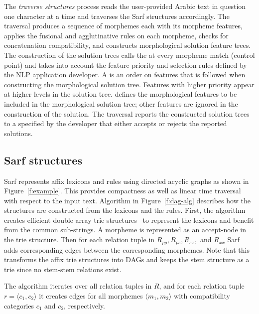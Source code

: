 The {\em traverse structures} process
reads the user-provided Arabic text in question one character at a time and traverses 
the Sarf structures accordingly. 
The traversal produces a sequence of morphemes each with its morpheme features,
applies the fusional and agglutinative rules on each morpheme, 
checks for concatenation compatibility,
and constructs morphological solution feature trees. 
The construction of the solution trees calls the  
at every morpheme match (control point) and takes into account 
the feature priority and selection rules 
defined by the NLP application developer. 
A  is an order on features that is 
followed when constructing the morphological solution tree. 
Features with higher priority appear at higher levels in the solution tree. 
 defines the morphological features to be included
in the morphological solution tree; other features are ignored in the 
construction of the solution. 
The traversal reports the constructed solution trees to a  specified by 
the developer that either accepts or rejects the reported solutions. 

\subsection{Sarf structures}


Sarf represents affix lexicons and rules using directed acyclic graphs as shown in Figure~\ref{f:example}. 
This provides compactness as well as linear time traversal with respect to the input text.
%
Algorithm  in Figure~\ref{f:dag-alg} describes how the 
structures are constructed from the lexicons and the rules. 
First, the algorithm creates efficient double array trie structures~\citep{Aoe:89} to
represent the lexicons and benefit from the common sub-strings. 
A morpheme is represented as an accept-node in the trie structure. 
Then for each relation tuple in $R_{pp}, R_{ps}, R_{sx},$ and $R_{xx}$ Sarf adds 
corresponding edges between the corresponding morphemes. 
Note that this transforms the affix trie structures into DAGs and keeps the 
stem structure as a trie since no stem-stem relations exist. 

The  algorithm iterates over all relation tuples in $R$, and for each
relation tuple $r=\langle c_1, c_2\rangle$ it creates edges for all morphemes 
$\langle m_1,m_2\rangle$ with compatibility categories $c_1$ and $c_2$, respectively. 

